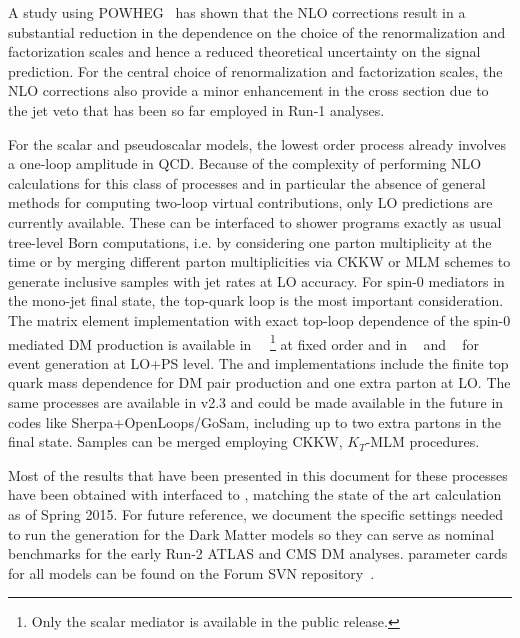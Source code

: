 A study using POWHEG~\cite{Haisch:2013ata,Fox:2012ru} has shown that the NLO corrections result in a substantial reduction in the dependence on the choice of the renormalization and factorization scales and hence a reduced theoretical uncertainty on the signal prediction. For the central choice of renormalization and factorization scales, the NLO corrections also provide a minor enhancement in the cross section due to the jet veto that has been so far employed in Run-1 analyses.

For the scalar and pseudoscalar models, the lowest order process
already involves a one-loop amplitude in QCD.
Because of the complexity of performing NLO calculations for this class of processes and in particular the absence of general methods for computing two-loop virtual contributions, only LO predictions are currently available. These can be interfaced to shower programs exactly as usual tree-level Born computations, i.e. by considering one parton multiplicity at the time
or by merging different parton multiplicities via CKKW or MLM schemes to generate inclusive samples with jet rates at LO accuracy.  For spin-0 mediators in the mono-jet final state,
the top-quark loop is the most important consideration.
The matrix element implementation with exact top-loop dependence of the \schannel spin-0 mediated DM production is available in \mcfm~\cite{Fox:2012ru,Harris:2014hga}~\footnote{Only the scalar mediator is available in the public release.} at fixed order and in \powheg~\cite{Haisch:2015ioa} and \madgraph~\cite{NewMadgraphModels} for event generation at LO+PS level. The \powheg and \mcfm implementations include the finite
top quark mass dependence for DM pair production and one extra parton at LO. 
The same processes are available in \madgraph v2.3 and could be made
available in the future in codes like {\sc Sherpa+OpenLoops/GoSam}, including up to two extra partons in the final state. Samples can be merged employing CKKW, $K_T$-MLM procedures.

Most of the results that have been presented in this document for these processes have been obtained with \powheg interfaced to \pythiaEight, matching the state of the art calculation as of Spring 2015. For future reference, we document the specific settings needed to run the \powheg generation for the Dark Matter models so they can serve as nominal benchmarks for the early Run-2 ATLAS and CMS DM analyses. \powheg parameter cards for all models can be found on the Forum SVN repository~\cite{ForumSVN_DMA, ForumSVN_DMV, ForumSVN_DMS_tloop, ForumSVN_DMP_tloop}.

